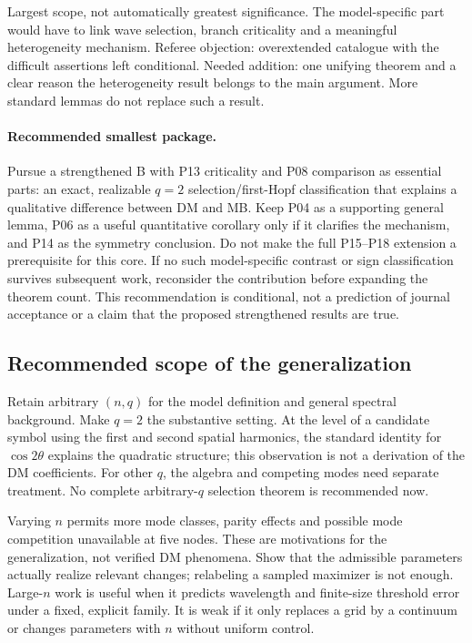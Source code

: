 \begin{description}[style=nextline,leftmargin=0pt,labelwidth=0pt,labelsep=0pt]
\item[D: all of B and C.]
Largest scope, not automatically greatest significance. The model-specific
part would have to link wave selection, branch criticality and a meaningful
heterogeneity mechanism. Referee objection: overextended catalogue with
the difficult assertions left conditional. Needed addition: one unifying
theorem and a clear reason the heterogeneity result belongs to the main
argument. More standard lemmas do not replace such a result.
\end{description}

\paragraph{Recommended smallest package.}
Pursue a strengthened B with P13 criticality and P08 comparison as
essential parts: an exact, realizable $q=2$ selection/first-Hopf
classification that explains a qualitative difference between DM and MB.
Keep P04 as a supporting general lemma, P06 as a useful quantitative
corollary only if it clarifies the mechanism, and P14 as the symmetry
conclusion. Do not make the full P15--P18 extension a prerequisite for
this core. If no such model-specific contrast or sign classification
survives subsequent work, reconsider the contribution before expanding
the theorem count. This recommendation is conditional, not a prediction
of journal acceptance or a claim that the proposed strengthened results
are true.

\subsection{Recommended scope of the generalization}
Retain arbitrary $(n,q)$ for the model definition and general spectral
background. Make $q=2$ the substantive setting. At the level of a
candidate symbol using the first and second spatial harmonics, the
standard identity for $\cos2\theta$ explains the quadratic structure;
this observation is not a derivation of the DM coefficients.
For other $q$, the algebra and competing modes need separate treatment.
No complete arbitrary-$q$ selection theorem is recommended now.

Varying $n$ permits more mode classes, parity effects and possible
mode competition unavailable at five nodes. These are motivations for
the generalization, not verified DM phenomena. Show that the admissible
parameters actually realize relevant changes; relabeling a sampled
maximizer is not enough. Large-$n$ work is useful when it predicts wavelength
and finite-size threshold error under a fixed, explicit family. It is
weak if it only replaces a grid by a continuum or changes parameters
with $n$ without uniform control.


